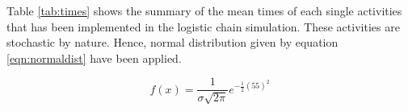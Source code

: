 Table \ref{tab:times} shows the summary of the mean times of each single activities that has been implemented in the logistic chain simulation. These activities are stochastic by nature. Hence, normal distribution given by equation \ref{eqn:normaldist} have been applied.

\begin{equation}
\label{eqn:normaldist}
f\left( x \right) = \frac{1}{\sigma \sqrt{2 \pi} } e^{- \frac{1}{2} \left( 55 \right)^{2}}
\end{equation}